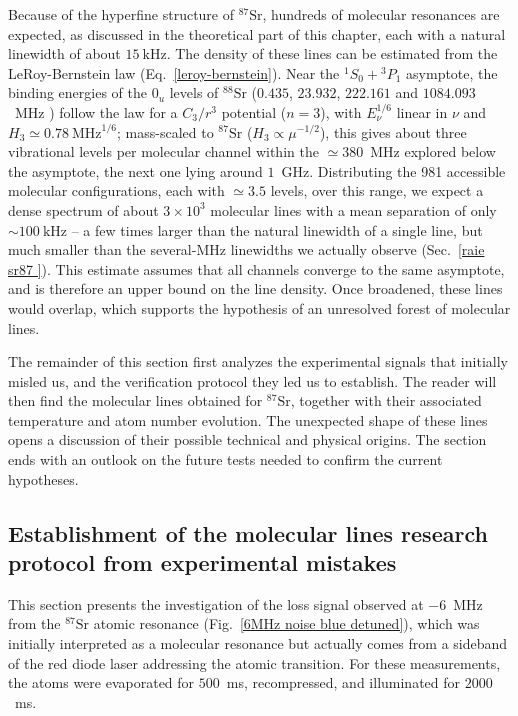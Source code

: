 Because of the hyperfine structure of $^{87}\text{Sr}$, hundreds of molecular resonances are
expected, as discussed in the theoretical part of this chapter, each with a natural
linewidth of about $15~\text{kHz}$.
The density of these lines can be estimated from the LeRoy-Bernstein law
(Eq.~\ref{leroy-bernstein}). Near the $^1S_0+{}^3P_1$ asymptote, the binding energies of
the $0_u$ levels of $^{88}\text{Sr}$ ($0.435$, $23.932$, $222.161$ and $1084.093$~MHz
\cite{zelevinsky_narrow_2006}) follow the law for a $C_3/r^3$ potential ($n=3$), with
$E_\nu^{1/6}$ linear in $\nu$ and $H_3\simeq0.78~\text{MHz}^{1/6}$; mass-scaled to
$^{87}\text{Sr}$ ($H_3\propto\mu^{-1/2}$), this gives about three vibrational levels per
molecular channel within the $\simeq380$~MHz explored below the asymptote, the next one
lying around $1$~GHz. Distributing the 981 accessible molecular configurations, each with
$\simeq3.5$ levels, over this range, we expect a dense spectrum of about $3\times10^3$
molecular lines with a mean separation of only $\sim 100~\text{kHz}$ -- a few times larger
than the natural linewidth of a single line, but much smaller than the several-MHz
linewidths we actually observe (Sec.~\ref{raie sr87 }). This estimate assumes that all
channels converge to the same asymptote, and is therefore an upper bound on the line
density. Once broadened, these lines would overlap, which supports the hypothesis of an
unresolved forest of molecular lines.


The remainder of this section first analyzes the experimental signals that initially
misled us, and the verification protocol they led us to establish. The reader will then
find the molecular lines obtained for $^{87}\text{Sr}$, together with their associated
temperature and atom number evolution. The unexpected shape of these lines opens a
discussion of their possible technical and physical origins. The section ends with an
outlook on the future tests needed to confirm the current hypotheses.


\subsection{Establishment of the molecular lines research protocol from experimental mistakes}
This section presents the investigation of the loss signal observed at $-6$~MHz from the
$^{87}\text{Sr}$ atomic resonance (Fig.~\ref{6MHz noise blue detuned}), which was initially
interpreted as a molecular resonance but actually comes from a sideband of the red diode
laser addressing the atomic transition. For these measurements, the atoms were evaporated
for $500$~ms, recompressed, and illuminated for $2000$~ms.


